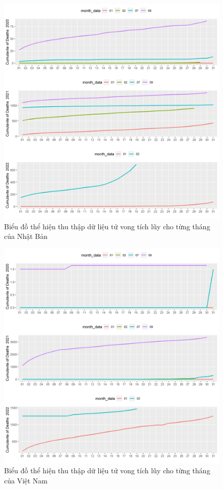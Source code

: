 \documentclass[a4paper]{article}
\theoremstyle{definition}
\begin{document}
\begin{enumerate}[i)]
\begin{enumerate}[1)]
\begin{figure}[htp]
		    \includegraphics[scale = 0.7]{Images/VI/vi8 Japan .jpeg}
		    \caption{Biểu đồ thể hiện thu thập dữ liệu tử vong tích lũy cho từng tháng của Nhật Bản}
		    \label{fig:my_label}
		\end{figure}
		\begin{figure}[htp]
		    \centering
		    \includegraphics[scale = 0.7]{Images/VI/vi8 Vietnam .jpeg} 
		    \caption{Biểu đồ thể hiện thu thập dữ liệu tử vong tích lũy cho từng tháng của Việt Nam}
		    \label{fig:my_label}
		 \end{figure}
		 \newpage
\end{enumerate}


\end{enumerate}
\end{document}
